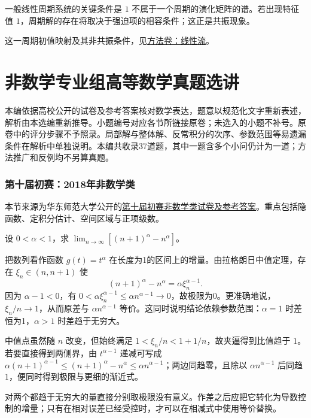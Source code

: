 \documentclass[UTF8,12pt,a4paper,fontset=fandol]{ctexart}
\begin{document}
\begin{remark}[方法与条件]一般线性周期系统的关键条件是 $1$ 不属于一个周期的演化矩阵的谱。若出现特征值 $1$，周期解的存在将取决于强迫项的相容条件；这正是共振现象。

这一周期初值映射及其非共振条件，见\hyperref[app:dynamics-flow]{方法卷：线性流}。\end{remark}

\part{非数学专业组高等数学真题选讲}

本编依据高校公开的试卷及参考答案核对数学表达，题意以规范化文字重新表述，解析由本选编重新推导。小题编号对应各节所链接原卷；未选入的小题不补号。原卷中的评分步骤不予照录。局部解与整体解、反常积分的次序、参数范围等易遗漏条件在解析中单独说明。本编共收录37道题，其中一题含多个小问仍计为一道；方法推广和反例均不另算真题。

\section{第十届初赛：2018年非数学类}
本节来源为华东师范大学公开的\href{https://math.ecnu.edu.cn/llin/pdf_files/nonmathans2018.pdf}{第十届初赛非数学类试卷及参考答案}。重点包括隐函数、定积分估计、空间区域与正项级数。

\begin{example}\label{nm-2018-1a}
设 $0<\alpha<1$，求 $\displaystyle\lim_{n\to\infty}[(n+1)^\alpha-n^\alpha]$。
\end{example}
\begin{solve}
把数列看作函数 $g(t)=t^\alpha$ 在长度为1的区间上的增量。由拉格朗日中值定理，存在 $\xi_n\in(n,n+1)$ 使
\[
 (n+1)^\alpha-n^\alpha=\alpha\xi_n^{\alpha-1}.
\]
因为 $\alpha-1<0$，有 $0<\alpha\xi_n^{\alpha-1}\leq\alpha n^{\alpha-1}\to0$，故极限为0。更准确地说，$\xi_n/n\to1$，从而原差与 $\alpha n^{\alpha-1}$ 等价。这同时说明结论依赖参数范围：$\alpha=1$ 时差恒为1，$\alpha>1$ 时差趋于无穷大。

中值点虽然随 $n$ 改变，但始终满足 $1<\xi_n/n<1+1/n$，故夹逼得到比值趋于 $1$。若要直接得到两侧界，由 $t^{\alpha-1}$ 递减可写成 $\alpha(n+1)^{\alpha-1}\le(n+1)^\alpha-n^\alpha\le\alpha n^{\alpha-1}$；两边同趋零，且除以 $\alpha n^{\alpha-1}$ 后同趋 $1$，便同时得到极限与更细的渐近式。

\end{solve}
\begin{remark}
对两个都趋于无穷大的量直接分别取极限没有意义。作差之后应把它转化为导数控制的增量；只有在相对误差已经受控时，才可以在相减式中使用等价替换。
\end{remark}
\end{document}
